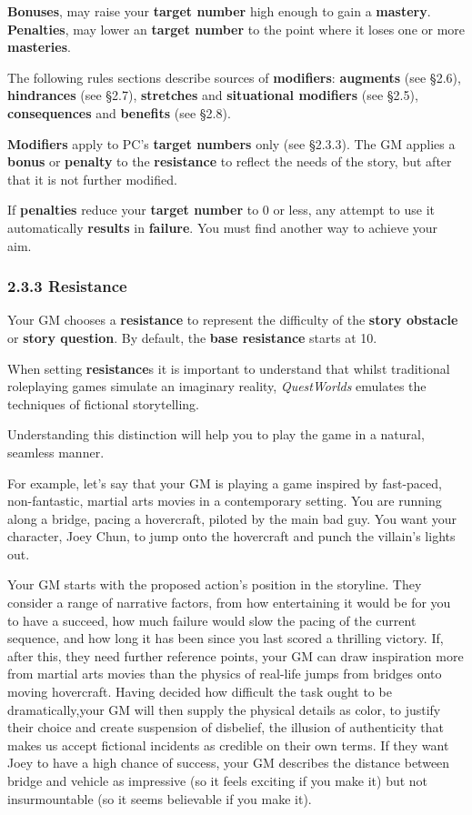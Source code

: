 \documentclass[
  11pt,
]{article}
\begin{document}
\textbf{Bonuses}, may raise your \textbf{target number} high enough to
gain a \textbf{mastery}. \textbf{Penalties}, may lower an \textbf{target
number} to the point where it loses one or more \textbf{masteries}.

The following rules sections describe sources of \textbf{modifiers}:
\textbf{augments} (see §2.6), \textbf{hindrances} (see §2.7),
\textbf{stretches} and \textbf{situational modifiers} (see §2.5),
\textbf{consequences} and \textbf{benefits} (see §2.8).

\textbf{Modifiers} apply to PC's \textbf{target numbers} only (see
§2.3.3). The GM applies a \textbf{bonus} or \textbf{penalty} to the
\textbf{resistance} to reflect the needs of the story, but after that it
is not further modified.

If \textbf{penalties} reduce your \textbf{target number} to 0 or less,
any attempt to use it automatically \textbf{results} in
\textbf{failure}. You must find another way to achieve your aim.

\hypertarget{resistance}{%
\subsubsection{2.3.3 Resistance}\label{resistance}}

Your GM chooses a \textbf{resistance} to represent the difficulty of the
\textbf{story obstacle} or \textbf{story question}. By default, the
\textbf{base resistance} starts at 10.

When setting \textbf{resistance}s it is important to understand that
whilst traditional roleplaying games simulate an imaginary reality,
\emph{QuestWorlds} emulates the techniques of fictional storytelling.

Understanding this distinction will help you to play the game in a
natural, seamless manner.

For example, let's say that your GM is playing a game inspired by
fast-paced, non-fantastic, martial arts movies in a contemporary
setting. You are running along a bridge, pacing a hovercraft, piloted by
the main bad guy. You want your character, Joey Chun, to jump onto the
hovercraft and punch the villain's lights out.

Your GM starts with the proposed action's position in the storyline.
They consider a range of narrative factors, from how entertaining it
would be for you to have a succeed, how much failure would slow the
pacing of the current sequence, and how long it has been since you last
scored a thrilling victory. If, after this, they need further reference
points, your GM can draw inspiration more from martial arts movies than
the physics of real-life jumps from bridges onto moving hovercraft.
Having decided how difficult the task ought to be dramatically,your GM
will then supply the physical details as color, to justify their choice
and create suspension of disbelief, the illusion of authenticity that
makes us accept fictional incidents as credible on their own terms. If
they want Joey to have a high chance of success, your GM describes the
distance between bridge and vehicle as impressive (so it feels exciting
if you make it) but not insurmountable (so it seems believable if you
make it).
\end{document}
